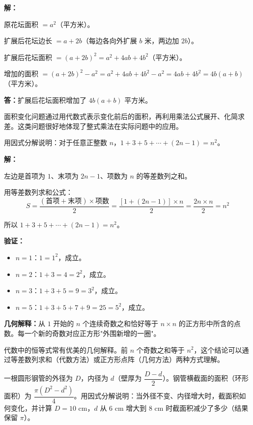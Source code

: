 \documentclass[12pt, a4paper]{ctexart}
\begin{document}
\textbf{解：}

原花坛面积 $= a^2$（平方米）。

扩展后花坛边长 $= a + 2b$（每边各向外扩展 $b$ 米，两边加 $2b$）。

扩展后花坛面积 $= (a + 2b)^2 = a^2 + 4ab + 4b^2$（平方米）。

增加的面积 $= (a + 2b)^2 - a^2 = a^2 + 4ab + 4b^2 - a^2 = 4ab + 4b^2 = 4b(a + b)$（平方米）。

\textbf{答：}扩展后花坛面积增加了 $4b(a + b)$ 平方米。

\begin{tipbox}[方法总结]
面积变化问题通过用代数式表示变化前后的面积，再利用乘法公式展开、化简求差。这类问题很好地体现了整式乘法在实际问题中的应用。
\end{tipbox}

\begin{appbox}
用因式分解说明：对于任意正整数 $n$，$1 + 3 + 5 + \cdots + (2n-1) = n^2$。
\end{appbox}

\textbf{解：}

左边是首项为 $1$、末项为 $2n-1$、项数为 $n$ 的等差数列之和。

用等差数列求和公式：
$$S = \frac{(\text{首项} + \text{末项}) \times \text{项数}}{2} = \frac{[1 + (2n - 1)] \times n}{2} = \frac{2n \times n}{2} = n^2$$

所以 $1 + 3 + 5 + \cdots + (2n-1) = n^2$。

\textbf{验证：}
\begin{itemize}[nosep]
  \item $n=1$：$1 = 1^2$，成立。
  \item $n=2$：$1+3 = 4 = 2^2$，成立。
  \item $n=3$：$1+3+5 = 9 = 3^2$，成立。
  \item $n=5$：$1+3+5+7+9 = 25 = 5^2$，成立。
\end{itemize}

\textbf{几何解释：}从 $1$ 开始的 $n$ 个连续奇数之和恰好等于 $n \times n$ 的正方形中所含的点数。每一个新的奇数对应正方形"外围新增的一圈"。

\begin{tipbox}[方法总结]
代数中的恒等式常有优美的几何解释。前 $n$ 个奇数之和等于 $n^2$，这个结论可以通过等差数列求和（代数方法）或正方形点阵（几何方法）两种方式理解。
\end{tipbox}

\begin{appbox}
一根圆形钢管的外径为 $D$，内径为 $d$（壁厚为 $\dfrac{D - d}{2}$）。钢管横截面的面积（环形面积）为 $\dfrac{\pi(D^2 - d^2)}{4}$。用因式分解说明：当外径不变、内径增大时，截面积如何变化，并计算 $D = 10$ cm，$d$ 从 $6$ cm 增大到 $8$ cm 时截面积减少了多少（结果保留 $\pi$）。
\end{appbox}
\end{document}

